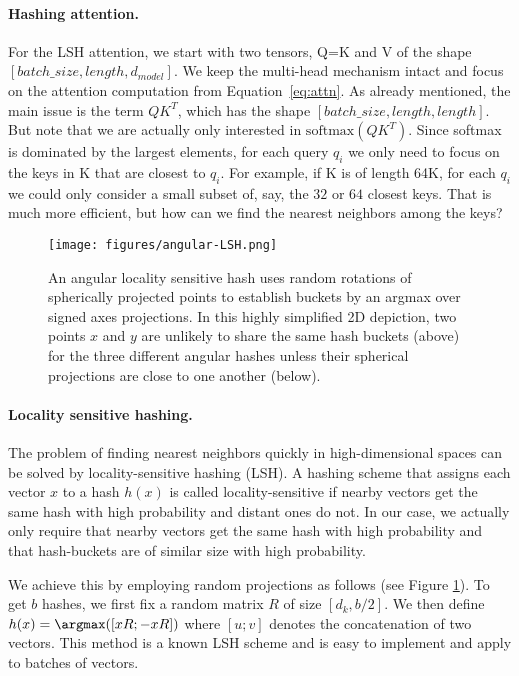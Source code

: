 \paragraph{Hashing attention.}
For the LSH attention, we start with two tensors, Q=K and V
of the shape $[batch\_size, length, d_{model}]$.
We keep the multi-head mechanism intact and focus on the attention
computation from Equation~\ref{eq:attn}. As already mentioned,
the main issue is the term $QK^T$, which has the shape
$[batch\_size, length, length]$. But note that we are actually only
interested in $\mathrm{softmax}(QK^T)$. Since softmax is dominated
by the largest elements, for each query $q_i$ we only need to focus
on the keys in K that are closest to $q_i$. For example, if K is of
length 64K, for each $q_i$ we could only consider a small subset of,
say, the $32$ or $64$ closest keys. That is much more efficient, but how
can we find the nearest neighbors among the keys?

\begin{figure}
    \centering
    \texttt{[image: figures/angular-LSH.png]}
    \caption{An angular locality sensitive hash uses random rotations of spherically projected 
    points to establish buckets by an argmax over signed axes projections.  In this highly 
    simplified 2D depiction, two points $x$ and $y$ are unlikely to share the same hash buckets 
    (above) for the three different angular hashes unless their spherical projections are close 
    to one another (below).}
    \label{fig:lsh}
\end{figure}

\paragraph{Locality sensitive hashing.}
The problem of finding nearest neighbors quickly in high-dimensional spaces
can be solved by locality-sensitive hashing (LSH). A hashing scheme that assigns each
vector $x$ to a hash $h(x)$ is called locality-sensitive if nearby
vectors get the same hash with high probability and distant ones do not.
In our case, we actually only require that nearby vectors get the same
hash with high probability and that hash-buckets are of similar size with
high probability.

We achieve this by employing random projections as follows (see Figure \ref{fig:lsh}).
To get $b$ hashes, we first fix a random matrix $R$ of size $[d_k, b/2]$.
We then define $h(x) = \argmax([xR; -xR])$ where $[u; v]$ denotes the concatenation of two vectors.
This method is a known LSH scheme \citep{andoni2015angularLSH} and is easy to implement
and apply to batches of vectors.

